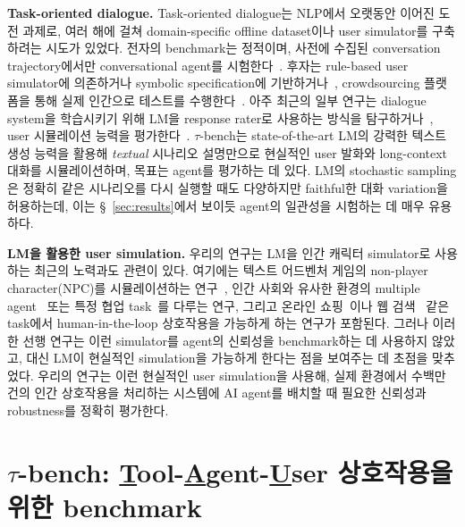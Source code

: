 \documentclass{article}
\newcommand{\benchmark}{$\tau$-bench}
\begin{document}
\textbf{Task-oriented dialogue.} Task-oriented dialogue는 NLP에서 오랫동안 이어진 도전 과제로, 여러 해에 걸쳐 domain-specific offline dataset이나 user simulator를 구축하려는 시도가 있었다. 전자의 benchmark는 정적이며, 사전에 수집된 conversation trajectory에서만 conversational agent를 시험한다~\cite{chen2021action, budzianowski2018multiwoz, andreas2020task}. 후자는 rule-based user simulator에 의존하거나 symbolic specification에 기반하거나~\cite{schatzmann2007evaluating,gur2018hidden}, crowdsourcing 플랫폼을 통해 실제 인간으로 테스트를 수행한다~\cite{he2018decoupling}. 아주 최근의 일부 연구는 dialogue system을 학습시키기 위해 LM을 response rater로 사용하는 방식을 탐구하거나~\cite{Hu_2023}, user 시뮬레이션 능력을 평가한다~\cite{yoon2024evaluating}. \benchmark{}는 state-of-the-art LM의 강력한 텍스트 생성 능력을 활용해 \textit{textual} 시나리오 설명만으로 현실적인 user 발화와 long-context 대화를 시뮬레이션하며, 목표는 agent를 평가하는 데 있다. LM의 stochastic sampling은 정확히 같은 시나리오를 다시 실행할 때도 다양하지만 faithful한 대화 variation을 허용하는데, 이는 \S~\ref{sec:results}에서 보이듯 agent의 일관성을 시험하는 데 매우 유용하다.

\textbf{LM을 활용한 user simulation.} 우리의 연구는 LM을 인간 캐릭터 simulator로 사용하는 최근의 노력과도 관련이 있다. 여기에는 텍스트 어드벤처 게임의 non-player character(NPC)를 시뮬레이션하는 연구~\cite{kim2022plm}, 인간 사회와 유사한 환경의 multiple agent~\cite{park2023generative} 또는 특정 협업 task~\cite{wu2023autogen}를 다루는 연구, 그리고 온라인 쇼핑~\cite{chen2024chatshop}이나 웹 검색~\cite{zhang2024usimagent} 같은 task에서 human-in-the-loop 상호작용을 가능하게 하는 연구가 포함된다. 그러나 이러한 선행 연구는 이런 simulator를 agent의 신뢰성을 benchmark하는 데 사용하지 않았고, 대신 LM이 현실적인 simulation을 가능하게 한다는 점을 보여주는 데 초점을 맞추었다. 우리의 연구는 이런 현실적인 user simulation을 사용해, 실제 환경에서 수백만 건의 인간 상호작용을 처리하는 시스템에 AI agent를 배치할 때 필요한 신뢰성과 robustness를 정확히 평가한다.


\section{\texorpdfstring{\benchmark{}: \underline{T}ool-\underline{A}gent-\underline{U}ser 상호작용을 위한 benchmark}{TAU-bench: Tool-Agent-User 상호작용 benchmark}}
\end{document}
